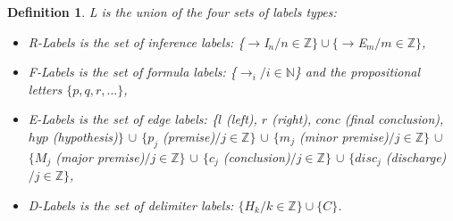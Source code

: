 \documentclass[submission,copyright,creativecommons]{eptcs}
\newtheorem{definition}{Definition}
\begin{document}
\begin{definition}
\label{defLbl} \emph{L} is the union of the four sets of labels types:

\begin{itemize}
\item  \emph{R-Labels} is the set of inference labels: \{$\to$I$_n / n\in 
\mathbb{Z}\} \cup \{ \to$E$_m/ m \in \mathbb{Z}\}$,

\item  \emph{F-Labels} is the set of formula labels: \{$\to_i / i \in 
\mathbb{N}$\} and the propositional letters $\{p, q, r, . . .\}$,

\item  \emph{E-Labels} is the set of edge labels: \{$l$ (left), $r$ (right), 
 $conc$ (final conclusion), $hyp$ (hypothesis)$\}$ $ \cup $ $\{ p_j$ (premise)$/ j \in \mathbb{Z}\}$ $ \cup $ $ \{ m_j$ (minor premise)$/ j \in \mathbb{Z}\} $ $\cup $ $ \{ M_j$ (major premise)$/ j \in \mathbb{Z}\}$ $\cup$ $ \{ c_j$ (conclusion)$/ j \in \mathbb{Z}\}$ $ \cup$ $ \{disc_j$ (discharge)$/ j \in \mathbb{Z}\}$,

\item  \emph{D-Labels} is the set of delimiter labels: $\{H_k/ k \in \mathbb{Z}\} \cup \{C\}$.
\end{itemize}
\end{definition}
\end{document}

